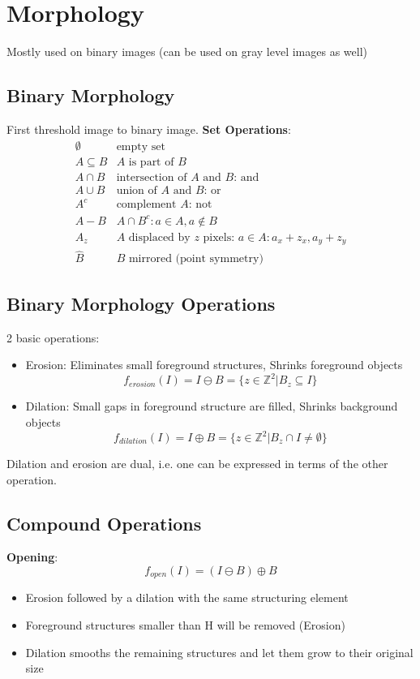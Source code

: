\section{Morphology}
Mostly used on binary images (can be used on gray level images as well)
\subsection{Binary Morphology}
First threshold image to binary image.
\textbf{Set Operations}:
\[
\begin{array}{rl}
\emptyset & \text{empty set} \\
A \subseteq B & A \text{ is part of } B \\
A \cap B & \text{intersection of } A \text{ and } B \text{: and} \\
A \cup B & \text{union of } A \text{ and } B \text{: or} \\
A^c & \text{complement } A \text{: not} \\
A - B & A \cap B^c : a \in A, a \notin B \\
A_z & A \text{ displaced by } z \text{ pixels: } a \in A : a_x + z_x, a_y + z_y \\
\hat{B} & B \text{ mirrored (point symmetry)}
\end{array}
\]
\subsection{Binary Morphology Operations}
2 basic operations:
\begin{itemize}
    \item Erosion: Eliminates small foreground structures, Shrinks foreground objects
    \[
    f_{erosion}(I) = I \ominus B = \{z \in \mathbb{Z}^2 | B_z \subseteq I\}
    \]
    \item Dilation: Small gaps in foreground structure are filled, Shrinks background objects
    \[
f_{dilation}(I) = I \oplus B = \{z \in \mathbb{Z}^2 | B_z \cap I \neq \emptyset\}
\]
\end{itemize}

Dilation and erosion are dual, i.e. one can be expressed in
terms of the other operation.
\subsection{Compound Operations}
\textbf{Opening}:
\[
f_{open}(I) = (I \ominus B) \oplus B
\]
\begin{itemize}
    \item Erosion followed by a dilation with the same structuring element
    \item Foreground structures smaller than H will be removed (Erosion)
    \item Dilation smooths the remaining structures and let them grow to their original size
\end{itemize}

